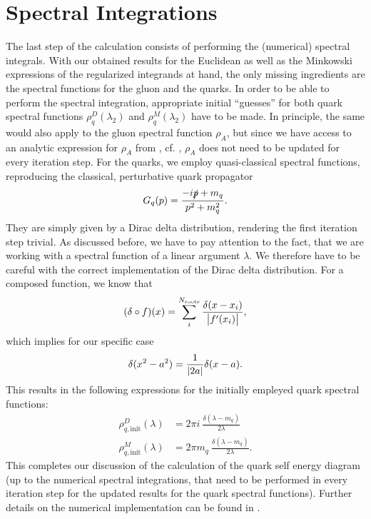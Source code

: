 \section*{Spectral Integrations}
The last step of the calculation consists of performing the (numerical) spectral integrals. With our obtained results for the Euclidean as well as the Minkowski expressions of the regularized integrands at hand, the only missing ingredients are the spectral functions for the gluon and the quarks. In order to be able to perform the spectral integration, appropriate initial \enquote{guesses} for both quark spectral functions $\rho_q^D(\lambda_2)$ and $\rho_q^M(\lambda_2)$ have to be made. In principle, the same would also apply to the gluon spectral function $\rho_A$, but since we have access to an analytic expression for $\rho_A$ from \cite{CyrolPawlowskiRothkopWink2018}, cf. , $\rho_A$ does not need to be updated for every iteration step. For the quarks, we employ quasi-classical spectral functions, reproducing  the classical, perturbative quark propagator
\begin{equation}
	G_q(p) = \frac{-i\slashed{p}+m_q}{p^2+m_q^2}.
\end{equation}
They are simply given by a Dirac delta distribution, rendering the first iteration step trivial. As discussed before, we have to pay attention to the fact, that we are working with a spectral function of a linear argument $\lambda$. We therefore have to be careful with the correct implementation of the Dirac delta distribution. For a composed  function, we know that
\begin{equation}
	(\delta\circ f)(x) = \sum_i^{N_{\mathrm{roots}}}\frac{\delta(x-x_i)}{\abs{f'(x_i)}},
\end{equation}
which implies for our specific case
\begin{equation}
	\delta(x^2-a^2) = \frac{1}{\abs{2a}}\delta(x-a).
\end{equation}
This results in the following expressions for the initially empleyed quark spectral functions:
	\begin{align}
		\rho_{q,\mathrm{init}}^D(\lambda) &= 2\pi i\ \frac{\delta(\lambda-m_q)}{2\lambda}\\
		\rho_{q,\mathrm{init}}^M(\lambda) &= 2\pi m_q\ \frac{\delta(\lambda-m_q)}{2\lambda}.
	\end{align}
This completes our discussion of the calculation of the quark self energy diagram (up to the numerical spectral integrations, that need to be performed in every iteration step for the updated results for the quark spectral functions). Further details on the numerical implementation can be found in .